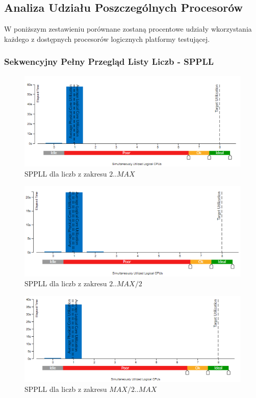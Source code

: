 \documentclass{article}
\begin{document}
            
        \subsection{Analiza Udziału Poszczególnych Procesorów}
            W poniższym zestawieniu porównane zostaną procentowe udziały wkorzystania każdego z dostępnych procesorów logicznych platformy testującej.
            
            \subsubsection{Sekwencyjny Pełny Przegląd Listy Liczb - \gls{SPPLL}}
                \begin{figure}[H]
                    \includegraphics[width=13cm]{sekwencyjny_bezsita_2_MAX}
                    \caption{\gls{SPPLL} dla liczb z zakresu $2 .. MAX$}
                \end{figure}
                \begin{figure}[H]
                    \includegraphics[width=13cm]{sekwencyjny_bezsita_2_MAX2}
                    \caption{\gls{SPPLL} dla liczb z zakresu $2 .. MAX / 2$}
                \end{figure}
                \begin{figure}[H]
                    \includegraphics[width=13cm]{sekwencyjny_bezsita_MAX2_MAX}
                    \caption{\gls{SPPLL} dla liczb z zakresu $MAX / 2 .. MAX$}
                \end{figure}
            
\end{document}
